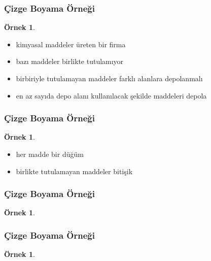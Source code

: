 \documentclass[dvipsnames]{beamer}
\theoremstyle{definition}
\theoremstyle{example}
\newtheorem{ornek}[theorem]{Örnek}
\theoremstyle{plain}
\begin{document}
\begin{frame}
  \frametitle{Çizge Boyama Örneği}

  \begin{ornek}
    \begin{itemize}
      \item kimyasal maddeler üreten bir firma
      \item bazı maddeler birlikte tutulamıyor
      \item birbiriyle tutulamayan maddeler farklı alanlara depolanmalı

      \pause
      \medskip
      \item en az sayıda depo alanı kullanılacak şekilde maddeleri depola
    \end{itemize}
  \end{ornek}
\end{frame}

\begin{frame}
  \frametitle{Çizge Boyama Örneği}

  \begin{ornek}
    \begin{itemize}
      \item her madde bir düğüm
      \item birlikte tutulamayan maddeler bitişik
    \end{itemize}

    \begin{center}
    \end{center}
  \end{ornek}
\end{frame}

\begin{frame}
  \frametitle{Çizge Boyama Örneği}

  \begin{ornek}
    \begin{center}
    \end{center}
  \end{ornek}
\end{frame}

\begin{frame}
  \frametitle{Çizge Boyama Örneği}

  \begin{ornek}
    \begin{columns}
      \begin{center}
      \end{center}

      \begin{center}
      \end{center}
    \end{columns}
  \end{ornek}
\end{frame}
\end{document}
